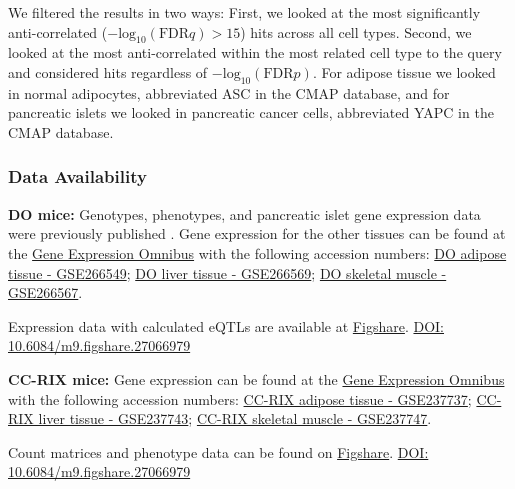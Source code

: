 \documentclass[
]{article}
\begin{document}
We filtered the results in two ways: First, we looked at the most
significantly anti-correlated
(\(-\mathrm{log}_{10}(\mathrm{FDR} q) > 15\)) hits across all cell
types. Second, we looked at the most anti-correlated within the most
related cell type to the query and considered hits regardless of
\(-\mathrm{log}_{10}(\mathrm{FDR} p)\). For adipose tissue we looked in
normal adipocytes, abbreviated ASC in the CMAP database, and for
pancreatic islets we looked in pancreatic cancer cells, abbreviated YAPC
in the CMAP database.

\subsubsection{Data Availability}\label{data-availability}

\textbf{DO mice:} Genotypes, phenotypes, and pancreatic islet gene
expression data were previously published \cite{pmid29567659}. Gene
expression for the other tissues can be found at the
\href{https://www.ncbi.nlm.nih.gov/geo/}{Gene Expression Omnibus} with
the following accession numbers:
\href{https://www.ncbi.nlm.nih.gov/geo/query/acc.cgi?acc=GSE266549}{DO
adipose tissue - GSE266549};
\href{https://www.ncbi.nlm.nih.gov/geo/query/acc.cgi?acc=GSE266569}{DO
liver tissue - GSE266569};
\href{https://www.ncbi.nlm.nih.gov/geo/query/acc.cgi?acc=GSE266567}{DO
skeletal muscle - GSE266567}.

Expression data with calculated eQTLs are available at
\href{https://figshare.com/}{Figshare}.
\href{https://figshare.com/articles/dataset/Data_and_code_for_High-Dimensional_Mediation_Analysis_HDMA_in_diversity_outbred_mice/27066979}{DOI:
10.6084/m9.figshare.27066979} \cite{cube_data}

\textbf{CC-RIX mice:} Gene expression can be found at the
\href{https://www.ncbi.nlm.nih.gov/geo/}{Gene Expression Omnibus} with
the following accession numbers:
\href{https://www.ncbi.nlm.nih.gov/geo/query/acc.cgi?acc=GSE237737}{CC-RIX
adipose tissue - GSE237737};
\href{https://www.ncbi.nlm.nih.gov/geo/query/acc.cgi?acc=GSE237743}{CC-RIX
liver tissue - GSE237743};
\href{https://www.ncbi.nlm.nih.gov/geo/query/acc.cgi?acc=GSE237747}{CC-RIX
skeletal muscle - GSE237747}.

Count matrices and phenotype data can be found on
\href{https://figshare.com/}{Figshare}.
\href{https://figshare.com/articles/dataset/Data_and_code_for_High-Dimensional_Mediation_Analysis_HDMA_in_diversity_outbred_mice/27066979}{DOI:
10.6084/m9.figshare.27066979} \cite{cube_data}
\end{document}
